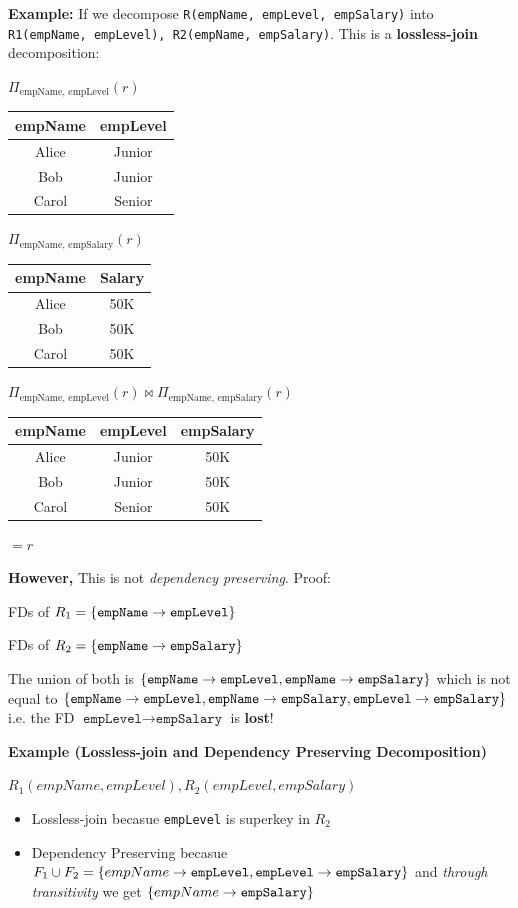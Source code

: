\documentclass{article}
\begin{document}
\textbf{Example: }If we decompose \texttt{R(empName, empLevel, empSalary)} into \texttt{R1(empName, empLevel), R2(empName, empSalary)}. This is a \textbf{lossless-join} decomposition:

$\Pi_{\text{empName, empLevel}}(r)$
\begin{tabular}{cc}
\toprule
\textbf{empName} & \textbf{empLevel} \\
\midrule
Alice & Junior \\
Bob   & Junior \\
Carol & Senior \\
\bottomrule
\end{tabular}

$\Pi_{\text{empName, empSalary}}(r)$
\begin{tabular}{cc}
\toprule
\textbf{empName} & \textbf{Salary} \\
\midrule
Alice & 50K \\
Bob   & 50K \\
Carol & 50K \\
\bottomrule
\end{tabular}

$\Pi_{\text{empName, empLevel}}(r) \Join \Pi_{\text{empName, empSalary}}(r)$

\begin{tabular}{ccc}
\toprule
\textbf{empName} & \textbf{empLevel} & \textbf{empSalary} \\
\midrule
Alice & Junior & 50K \\
Bob   & Junior & 50K \\
Carol & Senior & 50K \\
\bottomrule
\end{tabular}
$=r$

\textbf{However, }This is not \textit{dependency preserving}. Proof:

FDs of $R_1 = \{\texttt{empName} \to \texttt{empLevel}\}$

FDs of $R_2 = \{\texttt{empName} \to \texttt{empSalary}\} $

The union of both is $\{\texttt{empName} \to \texttt{empLevel}, \texttt{empName} \to \texttt{empSalary}\}$ which is not equal to $\{\texttt{empName} \to \texttt{empLevel},
\texttt{empName} \to \texttt{empSalary},
\texttt{empLevel} \to \texttt{empSalary}\}$
i.e. the FD $\texttt{empLevel} \to \texttt{empSalary}$ is \textbf{lost}!

\textbf{Example (Lossless-join and Dependency Preserving Decomposition)}

$R_1(empName, empLevel), R_2(empLevel, empSalary)$
\begin{itemize}
    \item Lossless-join becasue \texttt{empLevel} is superkey in $R_2$
    \item Dependency Preserving becasue $F_1 \cup F_2 = \{{empName} \to \texttt{empLevel}, \texttt{empLevel} \to \texttt{empSalary}\}$ and \textit{through transitivity} we get $\{{empName} \to \texttt{empSalary}\}$
\end{itemize}
\end{document}
